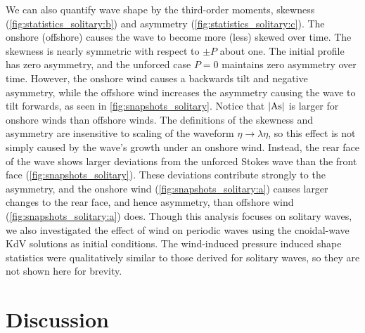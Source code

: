 \documentclass{jfm}
\DeclareMathOperator{\As}{As}
\begin{document}
We can also quantify wave shape by the third-order moments, skewness
(\cref{fig:statistics_solitary:b}) and asymmetry
(\cref{fig:statistics_solitary:c}).
The onshore (offshore) causes the wave to become more (less) skewed over
time.
The skewness is nearly symmetric with respect to $\pm P$ about one.
The initial profile has zero asymmetry, and the unforced case
$P=0$ maintains zero asymmetry over time.
However, the onshore wind causes a backwards tilt and negative
asymmetry, while the offshore wind increases the asymmetry causing the
wave to tilt forwards, as seen in \cref{fig:snapshots_solitary}.
Notice that $\abs{\As}$ is larger for onshore winds than offshore winds.
The definitions of the skewness and asymmetry are insensitive to scaling
of the waveform $\eta \to \lambda \eta$, so this effect is not simply
caused by the wave's growth under an onshore wind.
Instead, the rear face of the wave shows larger deviations from the
unforced Stokes wave than the front face
(\cref{fig:snapshots_solitary}).
These deviations contribute strongly to the asymmetry, and the onshore
wind (\cref{fig:snapshots_solitary:a}) causes larger changes to the rear
face, and hence asymmetry, than offshore wind
(\cref{fig:snapshots_solitary:a}) does.
Though this analysis focuses on solitary waves, we also investigated the
effect of wind on periodic waves using the cnoidal-wave KdV solutions as
initial conditions.
The wind-induced pressure induced shape statistics were qualitatively
similar to those derived for solitary waves, so they are not shown here
for brevity.

\section{\label{sec:discussion} Discussion}
\end{document}
